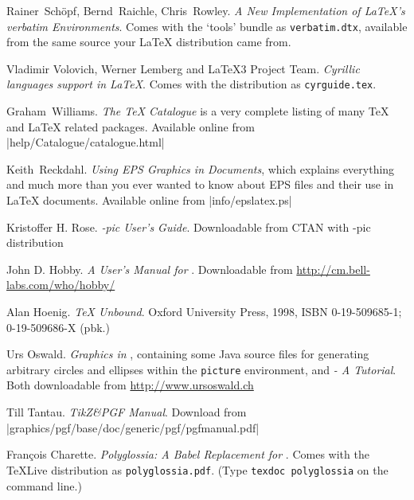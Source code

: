 \begin{thebibliography}{99}
 Rainer~Sch\"opf, Bernd~Raichle, Chris~Rowley.  
\newblock \emph{A New Implementation of \LaTeX's verbatim
  Environments}.
 \newblock Comes with the `tools' bundle as
  \texttt{verbatim.dtx}, available from the same source your \LaTeX{}
  distribution came from. 

 Vladimir Volovich, Werner Lemberg and \LaTeX3 Project Team.                    
    \newblock \emph{Cyrillic languages support in \LaTeX}.                                        
    \newblock Comes with the \LaTeXe{} distribution as                                            
  \texttt{cyrguide.tex}.                                                                          

 Graham~Williams.  \newblock \emph{The TeX
    Catalogue} is a very complete listing of many \TeX{} and \LaTeX{}
    related packages.
  \newblock Available online from \CTAN|help/Catalogue/catalogue.html|
  
 Keith~Reckdahl.  \newblock \emph{Using EPS Graphics in
    \LaTeXe{} Documents}, which explains everything and much more than
  you ever wanted to know about EPS files and their use in \LaTeX{}
  documents.  \newblock Available online from
  \CTAN|info/epslatex.ps|

 Kristoffer H. Rose.
  \newblock \emph{\Xy-pic User's Guide}.  \newblock
  Downloadable from CTAN with \Xy-pic distribution 
  
 John D. Hobby.
  \newblock \emph{A User's Manual for \MP}. \newblock
  Downloadable from \url{http://cm.bell-labs.com/who/hobby/} 
  
 Alan Hoenig.
  \newblock \emph{\TeX{} Unbound}. \newblock Oxford University Press, 1998,
    ISBN 0-19-509685-1; 0-19-509686-X (pbk.) 
  
 Urs Oswald.  
    \newblock \emph{Graphics in \LaTeXe{}}, containing some Java source files for 
    generating arbitrary circles and ellipses within the \texttt{picture} environment,
    and \emph{\MP - A Tutorial}.
  \newblock Both downloadable from \url{http://www.ursoswald.ch}

 Till Tantau.
  \newblock \emph{TikZ\&PGF Manual}.\newblock
  Download from \CTAN|graphics/pgf/base/doc/generic/pgf/pgfmanual.pdf|

 Fran\c{c}ois Charette.                    
    \newblock \emph{Polyglossia: A Babel Replacement for }.                                        
    \newblock Comes with the \TeX Live distribution as                                            
  \texttt{polyglossia.pdf}. (Type \texttt{texdoc polyglossia} on the command line.)


\end{thebibliography}
